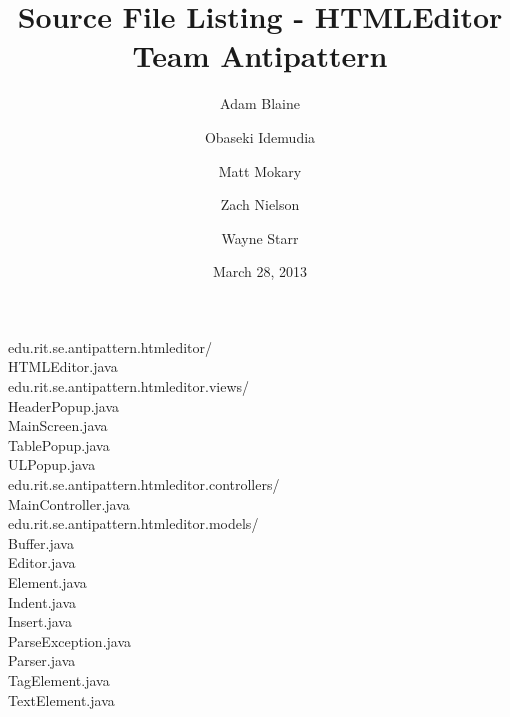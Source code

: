 \documentclass[a4paper,12pt]{article}
\title{
    Source File Listing - HTMLEditor\\
    Team Antipattern
}
\author{
    Adam Blaine
    \and
    Obaseki Idemudia
    \and
    Matt Mokary
    \and
    Zach Nielson
    \and
    Wayne Starr
}
\date{March 28, 2013}
\newcommand{\tab}{\hspace*{3em}}
\begin{document}
\maketitle

\fontsize{14}{14}
\ttfamily

edu.rit.se.antipattern.htmleditor/\\
\tab HTMLEditor.java\\
edu.rit.se.antipattern.htmleditor.views/\\
\tab HeaderPopup.java\\
\tab MainScreen.java\\
\tab TablePopup.java\\
\tab ULPopup.java\\
edu.rit.se.antipattern.htmleditor.controllers/\\
\tab MainController.java\\
edu.rit.se.antipattern.htmleditor.models/\\
\tab Buffer.java\\
\tab Editor.java\\
\tab Element.java\\
\tab Indent.java\\
\tab Insert.java\\
\tab ParseException.java\\
\tab Parser.java\\
\tab TagElement.java\\
\tab TextElement.java\\
\end{document}
